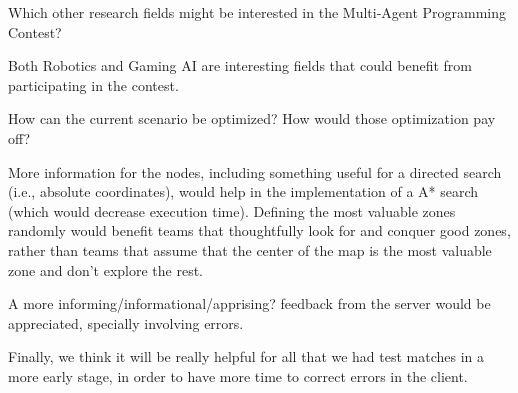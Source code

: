 \begin{question}
Which other research fields might be interested in the Multi-Agent
Programming Contest?
\end{question}

Both Robotics and Gaming AI are interesting fields that could benefit from
participating in the contest.

\begin{question}
How can the current scenario be optimized? How would those optimization pay off?
\end{question}

More information for the nodes, including something useful for a directed search
(i.e., absolute coordinates), would help in the implementation of a A* search
(which would decrease execution time).  Defining the most valuable zones
randomly would benefit teams that thoughtfully look for and conquer good zones,
rather than teams that assume that the center of the map is the most valuable
zone and don't explore the rest.

A more informing/informational/apprising? feedback from the server would be
appreciated, specially involving errors.

Finally, we think it will be really helpful for all that we had test matches in
a more early stage, in order to have more time to correct errors in the client.
